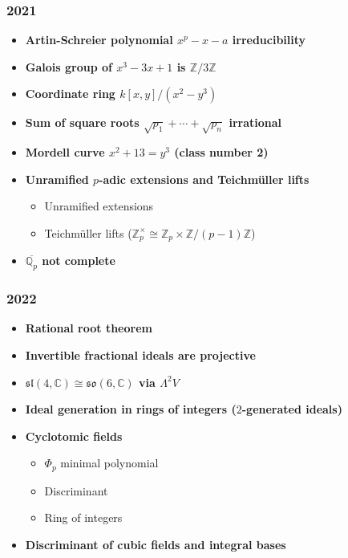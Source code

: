 \subsubsection*{2021}
\begin{itemize}
    \item \textbf{Artin-Schreier polynomial $x^p-x-a$ irreducibility}
    \item \textbf{Galois group of $x^3-3x+1$ is $\mathbb{Z}/3\mathbb{Z}$}
    \item \textbf{Coordinate ring $k[x,y]/(x^2-y^3)$}
    \item \textbf{Sum of square roots $\sqrt{p_1}+\cdots+\sqrt{p_n}$ irrational}
    \item \textbf{Mordell curve $x^2+13=y^3$ (class number 2)}
    \item \textbf{Unramified $p$-adic extensions and Teichm\"uller lifts}
        \begin{itemize}
            \item Unramified extensions
            \item Teichm\"uller lifts ($\mathbb{Z}_p^\times \cong \mathbb{Z}_p \times \mathbb{Z}/(p-1)\mathbb{Z}$)
        \end{itemize}
    \item \textbf{$\overline{\mathbb{Q}_p}$ not complete}
\end{itemize}

\subsubsection*{2022}
\begin{itemize}
    \item \textbf{Rational root theorem}
    \item \textbf{Invertible fractional ideals are projective}
    \item \textbf{$\mathfrak{sl}(4,\mathbb{C}) \cong \mathfrak{so}(6,\mathbb{C})$ via $\Lambda^2 V$}
    \item \textbf{Ideal generation in rings of integers ($2$-generated ideals)}
    \item \textbf{Cyclotomic fields}
        \begin{itemize}
            \item $\Phi_p$ minimal polynomial
            \item Discriminant
            \item Ring of integers
        \end{itemize}
    \item \textbf{Discriminant of cubic fields and integral bases}
\end{itemize}

